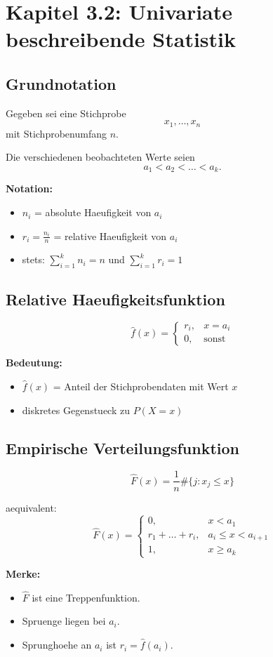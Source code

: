 \documentclass[a4paper,11pt]{article}
\begin{document}
\section{Kapitel 3.2: Univariate beschreibende Statistik}

\subsection{Grundnotation}
Gegeben sei eine Stichprobe
\[
x_1,\dots,x_n
\]
mit Stichprobenumfang $n$.

Die verschiedenen beobachteten Werte seien
\[
a_1< a_2 < \dots < a_k.
\]

\textbf{Notation:}
\begin{itemize}
  \item $n_i$ = absolute Haeufigkeit von $a_i$
  \item $r_i=\frac{n_i}{n}$ = relative Haeufigkeit von $a_i$
  \item stets: $\sum_{i=1}^k n_i=n$ und $\sum_{i=1}^k r_i=1$
\end{itemize}

\subsection{Relative Haeufigkeitsfunktion}
\[
\hat f(x)=
\begin{cases}
r_i,& x=a_i\\
0,& \text{sonst}
\end{cases}
\]

\textbf{Bedeutung:}
\begin{itemize}
  \item $\hat f(x)$ = Anteil der Stichprobendaten mit Wert $x$
  \item diskretes Gegenstueck zu $P(X=x)$
\end{itemize}

\subsection{Empirische Verteilungsfunktion}
\[
\hat F(x)=\frac{1}{n}\#\{j: x_j\le x\}
\]

aequivalent:
\[
\hat F(x)=
\begin{cases}
0,& x<a_1\\
r_1+\dots+r_i,& a_i\le x<a_{i+1}\\
1,& x\ge a_k
\end{cases}
\]

\textbf{Merke:}
\begin{itemize}
  \item $\hat F$ ist eine Treppenfunktion.
  \item Spruenge liegen bei $a_i$.
  \item Sprunghoehe an $a_i$ ist $r_i=\hat f(a_i)$.
\end{itemize}
\end{document}
